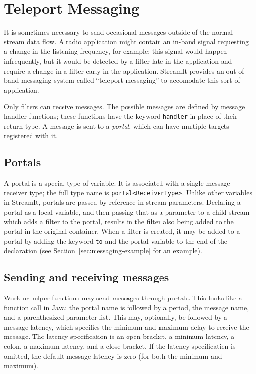\documentclass[11pt]{article}
\begin{document}
\section{Teleport Messaging}
\label{sec:messaging}

It is sometimes necessary to send occasional messages outside of the
normal stream data flow.  A radio application might contain an in-band
signal requesting a change in the listening frequency, for example;
this signal would happen infrequently, but it would be detected by a
filter late in the application and require a change in a filter early
in the application.  StreamIt provides an out-of-band messaging system
called ``teleport messaging'' to accomodate this sort of application.

Only filters can receive messages.  The possible messages are defined
by message handler functions; these functions have the keyword
\lstinline|handler| in place of their return type.  A message is sent
to a \emph{portal}, which can have multiple targets registered with
it.

\subsection{Portals}  

A portal is a special type of variable.  It is associated with a
single message receiver type; the full type name is
\lstinline|portal<ReceiverType>|.  Unlike other variables in StreamIt,
portals are passed by reference in stream parameters.  Declaring a
portal as a local variable, and then passing that as a parameter to a
child stream which adds a filter to the portal, results in the filter
also being added to the portal in the original container.  When a
filter is created, it may be added to a portal by adding the keyword
\lstinline|to| and the portal variable to the end of the declaration
(see Section~\ref{sec:messaging-example} for an example).

\subsection{Sending and receiving messages}  

Work or helper functions may send messages through portals.  This
looks like a function call in Java: the portal name is followed by a
period, the message name, and a parenthesized parameter list.  This
may, optionally, be followed by a message latency, which specifies the
minimum and maximum delay to receive the message.  The latency
specification is an open bracket, a minimum latency, a colon, a
maximum latency, and a close bracket.  If the latency specification is
omitted, the default message latency is zero (for both the minimum and
maximum).
\end{document}
